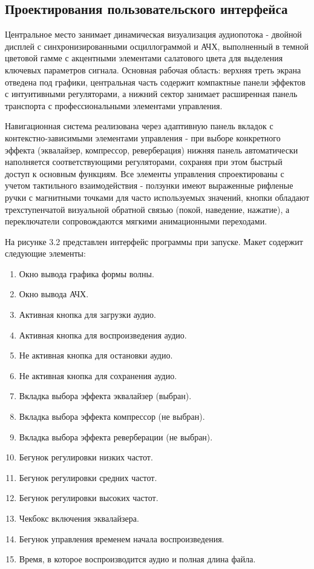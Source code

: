 \subsection{Проектирования пользовательского интерфейса}

Центральное место занимает динамическая визуализация аудиопотока - двойной дисплей с синхронизированными осциллограммой и АЧХ, выполненный в темной цветовой гамме с акцентными элементами салатового цвета для выделения ключевых параметров сигнала. Основная рабочая область: верхняя треть экрана отведена под графики, центральная часть содержит компактные панели эффектов с интуитивными регуляторами, а нижний сектор занимает расширенная панель транспорта с профессиональными элементами управления.

Навигационная система реализована через адаптивную панель вкладок с контекстно-зависимыми элементами управления - при выборе конкретного эффекта (эквалайзер, компрессор, реверберация) нижняя панель автоматически наполняется соответствующими регуляторами, сохраняя при этом быстрый доступ к основным функциям. Все элементы управления спроектированы с учетом тактильного взаимодействия - ползунки имеют выраженные рифленые ручки с магнитными точками для часто используемых значений, кнопки обладают трехступенчатой визуальной обратной связью (покой, наведение, нажатие), а переключатели сопровождаются мягкими анимационными переходами.

На рисунке 3.2 представлен интерфейс программы при запуске. Макет содержит следующие элементы:
\begin{enumerate}
	\item Окно вывода графика формы волны.
	\item Окно вывода АЧХ.
	\item Активная кнопка для загрузки аудио.
	\item Активная кнопка для воспроизведения аудио.
	\item Не активная кнопка для остановки аудио.
	\item Не активная кнопка для сохранения аудио.
	\item Вкладка выбора эффекта эквалайзер (выбран).
	\item Вкладка выбора эффекта компрессор (не выбран).
	\item Вкладка выбора эффекта реверберации (не выбран).
	\item Бегунок регулировки низких частот.
	\item Бегунок регулировки средних частот.
	\item Бегунок регулировки высоких частот.
	\item Чекбокс включения эквалайзера.
	\item Бегунок управления временем начала воспроизведения.
	\item Время, в которое воспроизводится аудио и полная длина файла.
\end{enumerate}

